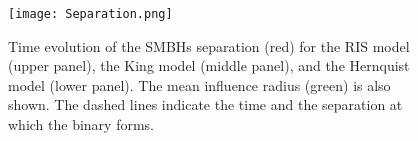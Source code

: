 \documentclass[fleqn,usenatbib]{mnras}
\begin{document}
\begin{figure}\centering
	\texttt{[image: Separation.png]}
    \caption{Time evolution of the SMBHs separation (red) for the RIS model (upper panel), the King model (middle panel), and the Hernquist model (lower panel). The mean influence radius (green) is also shown. The dashed lines indicate the time and the separation at which the binary forms.}
    \label{fig:Separation}
\end{figure}

\nocite{*}

 


\label{lastpage}
\end{document}
